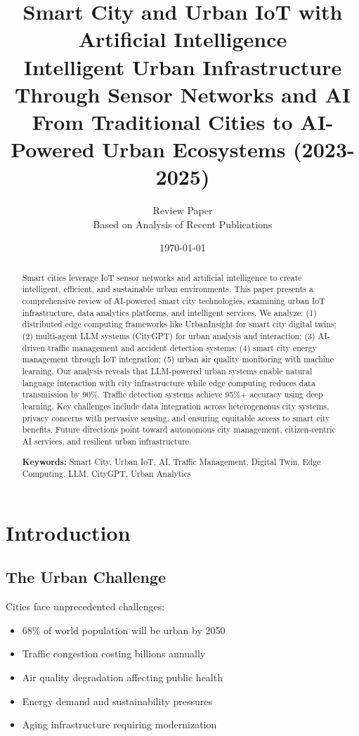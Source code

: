 \documentclass[12pt,a4paper]{article}
\title{
\vspace{-1cm}
{\Huge\bfseries Smart City and Urban IoT with Artificial Intelligence}\\[0.5cm]
{\Large Intelligent Urban Infrastructure Through Sensor Networks and AI}\\[0.3cm]
{\large From Traditional Cities to AI-Powered Urban Ecosystems (2023-2025)}
}
\author{
\large Review Paper\\[0.2cm]
\normalsize Based on Analysis of Recent Publications
}
\date{\today}
\begin{document}
\maketitle
\thispagestyle{empty}

\begin{abstract}
\noindent
Smart cities leverage IoT sensor networks and artificial intelligence to create intelligent, efficient, and sustainable urban environments. This paper presents a comprehensive review of AI-powered smart city technologies, examining urban IoT infrastructure, data analytics platforms, and intelligent services. We analyze: (1) distributed edge computing frameworks like UrbanInsight for smart city digital twins; (2) multi-agent LLM systems (CityGPT) for urban analysis and interaction; (3) AI-driven traffic management and accident detection systems; (4) smart city energy management through IoT integration; (5) urban air quality monitoring with machine learning. Our analysis reveals that LLM-powered urban systems enable natural language interaction with city infrastructure while edge computing reduces data transmission by 90\%. Traffic detection systems achieve 95\%+ accuracy using deep learning. Key challenges include data integration across heterogeneous city systems, privacy concerns with pervasive sensing, and ensuring equitable access to smart city benefits. Future directions point toward autonomous city management, citizen-centric AI services, and resilient urban infrastructure.

\vspace{0.3cm}
\noindent\textbf{Keywords:} Smart City, Urban IoT, AI, Traffic Management, Digital Twin, Edge Computing, LLM, CityGPT, Urban Analytics
\end{abstract}

\newpage
\tableofcontents
\newpage

\section{Introduction}

\subsection{The Urban Challenge}

Cities face unprecedented challenges:
\begin{itemize}[leftmargin=*]
    \item 68\% of world population will be urban by 2050
    \item Traffic congestion costing billions annually
    \item Air quality degradation affecting public health
    \item Energy demand and sustainability pressures
    \item Aging infrastructure requiring modernization
\end{itemize}
\end{document}
